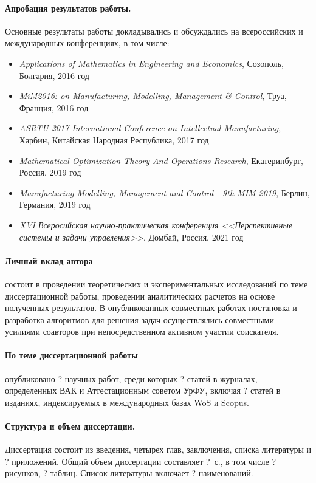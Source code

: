 \paragraph*{Апробация результатов работы.}
Основные результаты работы докладывались и обсуждались на всероссийских и международных конференциях, в том числе:

\begin{itemize}
    \item
    \textit{Applications of Mathematics in Engineering and Economics},
    Созополь, Болгария, 2016 год
    \item
    \textit{MiM2016: on Manufacturing, Modelling, Management \& Control},
    Труа, Франция, 2016 год
    \item
    \textit{ASRTU 2017 International Conference on Intellectual Manufacturing},
    Харбин, Китайская Народная Республика, 2017 год
    \item
    \textit{Mathematical Optimization Theory And Operations Research},
    Екатеринбург, Россия, 2019 год
    \item
    \textit{Manufacturing Modelling, Management and Control - 9th MIM 2019},
    Берлин, Германия, 2019 год
    \item
    \textit{XVI Всеросийская научно-практическая конференция
    <<Перспективные системы и задачи управления>>},
    Домбай, Россия, 2021 год
\end{itemize}

\paragraph*{Личный вклад автора}
состоит в проведении теоретических и экспериментальных исследований
по теме диссертационной работы,
проведении аналитических расчетов на основе полученных результатов.
В опубликованных совместных работах постановка и разработка алгоритмов для
решения задач осуществлялись совместными усилиями соавторов
при непосредственном активном участии соискателя.

\paragraph*{По теме диссертационной работы}
опубликовано ? научных работ,
среди которых ? статей в журналах, определенных ВАК и Аттестационным советом УрФУ,
включая ? статей в изданиях, индексируемых в международных базах WoS и Scopus.

\paragraph*{Структура и объем диссертации.}
Диссертация состоит из введения,
четырех глав, заключения, списка литературы и ? приложений.
Общий объем диссертации составляет ?~с.,
в том числе ? рисунков, ? таблиц.
Список литературы включает ? наименований.
